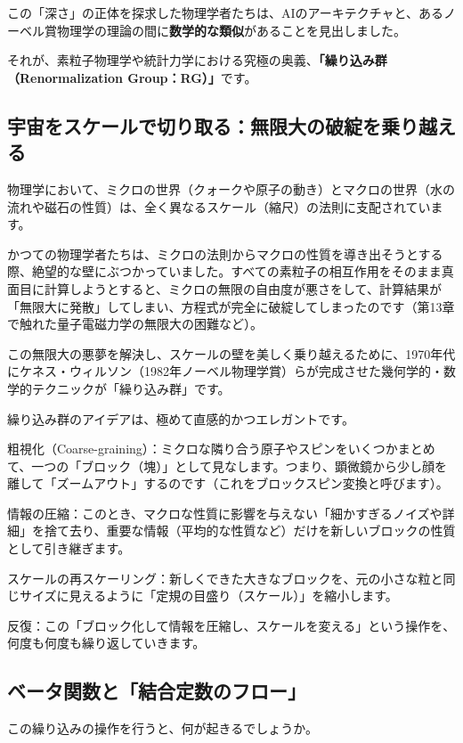 この「深さ」の正体を探求した物理学者たちは、AIのアーキテクチャと、あるノーベル賞物理学の理論の間に\textbf{数学的な類似}があることを見出しました。

それが、素粒子物理学や統計力学における究極の奥義、\textbf{「繰り込み群（Renormalization Group：RG）」}です。

\subsection{宇宙をスケールで切り取る：無限大の破綻を乗り越える}

物理学において、ミクロの世界（クォークや原子の動き）とマクロの世界（水の流れや磁石の性質）は、全く異なるスケール（縮尺）の法則に支配されています。

かつての物理学者たちは、ミクロの法則からマクロの性質を導き出そうとする際、絶望的な壁にぶつかっていました。すべての素粒子の相互作用をそのまま真面目に計算しようとすると、ミクロの無限の自由度が悪さをして、計算結果が「無限大に発散」してしまい、方程式が完全に破綻してしまったのです（第13章で触れた量子電磁力学の無限大の困難など）。

この無限大の悪夢を解決し、スケールの壁を美しく乗り越えるために、1970年代にケネス・ウィルソン（1982年ノーベル物理学賞）らが完成させた幾何学的・数学的テクニックが「繰り込み群」です。

繰り込み群のアイデアは、極めて直感的かつエレガントです。

粗視化（Coarse-graining）：ミクロな隣り合う原子やスピンをいくつかまとめて、一つの「ブロック（塊）」として見なします。つまり、顕微鏡から少し顔を離して「ズームアウト」するのです（これをブロックスピン変換と呼びます）。

情報の圧縮：このとき、マクロな性質に影響を与えない「細かすぎるノイズや詳細」を捨て去り、重要な情報（平均的な性質など）だけを新しいブロックの性質として引き継ぎます。

スケールの再スケーリング：新しくできた大きなブロックを、元の小さな粒と同じサイズに見えるように「定規の目盛り（スケール）」を縮小します。

反復：この「ブロック化して情報を圧縮し、スケールを変える」という操作を、何度も何度も繰り返していきます。

\subsection{ベータ関数と「結合定数のフロー」}

この繰り込みの操作を行うと、何が起きるでしょうか。

